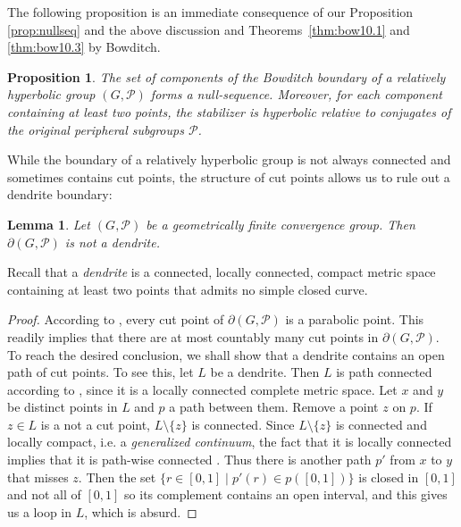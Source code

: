 \documentclass[11pt]{article}
\newtheorem{lemma}[theorem]{Lemma}
\newtheorem{proposition}[theorem]{Proposition}
\theoremstyle{definition}
\newcommand\PP{\mathcal{P}}
\begin{document}
The following proposition 
is an immediate consequence of our Proposition \ref{prop:nullseq} and the above discussion and Theorems~\ref{thm:bow10.1} and \ref{thm:bow10.3} by Bowditch. 

\begin{proposition}\label{prop:infends} The set of components of the Bowditch boundary of a relatively hyperbolic group $(G,\PP)$ 
forms a null-sequence. Moreover, for each 
component containing at least two points, the stabilizer is hyperbolic relative to conjugates of the original
peripheral subgroups $\PP$. \end{proposition}


While the boundary of a relatively hyperbolic group is not always connected and sometimes contains cut points, the structure of cut points allows us to rule out a dendrite boundary: 

\begin{lemma}\label{cor:nodendrite} 
Let $(G, \mathcal{P})$ 
be a geometrically finite convergence group. 
Then $\partial(G, \mathcal{P})$ is not a dendrite.
\end{lemma} 

Recall that a \emph{dendrite} is a connected, locally connected, compact metric space containing at least two points that
admits no simple closed curve.

\begin{proof}
 According to \cite[Theorem 1.1]{Dasgupta:Hruska}, every cut point of $\partial(G, \mathcal{P})$ is a parabolic point. This readily implies that there are at most countably many cut points in $\partial(G, \mathcal{P})$.
 To reach the desired conclusion, we shall show that a dendrite contains an open path of cut points. To see this, let $L$ be a dendrite. Then $L$ is path connected according to \cite[II.5.1]{whyburnantop}, since it is a locally connected complete metric space. Let $x$ and $y$ be distinct points in $L$ and $p$ a path between them. Remove a point $z$ on $p$.  If $z \in L$ is a not a cut point, $L \setminus \{z\}$ is connected. Since $L\setminus\{z\}$ is connected and locally compact, i.e. a \emph{generalized continuum}, the fact that it is locally connected implies that it is path-wise connected \cite[II.5.2]{whyburnantop}. 
 Thus there is another path $p'$ from $x$ to $y$ that misses $z$. Then the set $\{r\in[0,1] \mid p'(r) \in p([0, 1])\}$ is closed in $[0, 1]$ and not all of $[0, 1]$ so its complement contains an open interval, and this gives us a loop in $L$, which is absurd.
\end{proof} 
\end{document}
